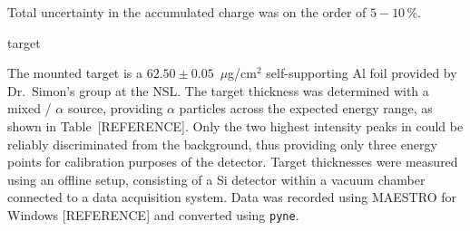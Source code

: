 






Total uncertainty in the accumulated charge was on the order of $5-10$\,\%.

target

The mounted target is a $62.50\pm0.05$~$\mu$g/cm$^2$ self-supporting Al foil
provided by Dr.\ Simon's group at the NSL. The target thickness was determined
with a mixed / $\alpha$ source, providing $\alpha$
particles across the expected energy range, as shown in Table~[REFERENCE].
Only the two highest intensity peaks in  could be reliably
discriminated from the background, thus providing only three energy points for
calibration purposes of the detector. Target thicknesses were measured using an
offline setup, consisting of a Si detector within a vacuum chamber connected to
a data acquisition system. Data was recorded using MAESTRO for Windows
[REFERENCE] and converted using \texttt{pyne}.
